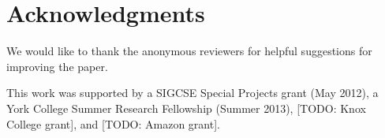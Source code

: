 \documentclass{sig-alternate}
\begin{document}
%
%
%
%
%
%
%
%

\section{Acknowledgments}

We would like to thank the anonymous reviewers for helpful suggestions
for improving the paper.

This work was supported by a SIGCSE Special Projects grant (May 2012),
a York College Summer Research Fellowship (Summer 2013), [TODO: Knox College
grant], and [TODO: Amazon grant].


  

\end{document}
